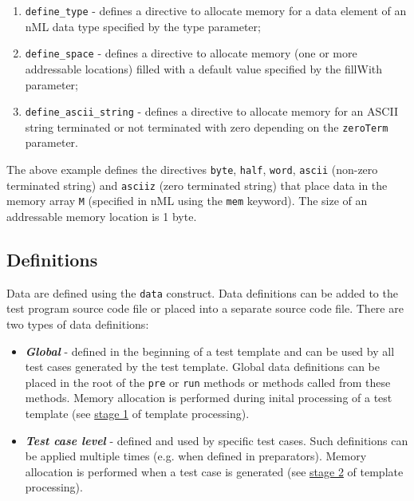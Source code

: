 \documentclass[oneside,final,12pt]{extreport}
\begin{document}
\begin{enumerate}
  \item \texttt{define{\_}type} - defines a directive to allocate memory for a data element
        of an nML data type specified by the type parameter;

  \item \texttt{define{\_}space} - defines a directive to allocate memory (one or more
        addressable locations) filled with a default value specified by the
        fillWith parameter;

  \item \texttt{define{\_}ascii{\_}string} - defines a directive to allocate memory for an
        ASCII string terminated or not terminated with zero depending on the
        \texttt{zeroTerm} parameter.
\end{enumerate}

The above example defines the directives \texttt{byte}, \texttt{half}, \texttt{word},
\texttt{ascii} (non-zero terminated string) and \texttt{asciiz} (zero terminated string)
that place data in the memory array \texttt{M} (specified in nML using the \texttt{mem} keyword).
The size of an addressable memory location is 1 byte.

\subsection{Definitions}

Data are defined using the \texttt{data} construct. Data definitions can be added to the test
program source code file or placed into a separate source code file. There are two types of
data definitions:

\begin{itemize}
\item \textbf{\textit{Global}} - defined in the beginning of a test template and can be used by
      all test cases generated by the test template. Global data definitions can be placed in
      the root of the \texttt{pre} or \texttt{run} methods or methods called from these methods.
      Memory allocation is performed during inital processing of a test template (see
      \hyperref[ttp_stage_1]{stage 1} of template processing).

\item \textbf{\textit{Test case level}} - defined and used by specific test cases. Such definitions
      can be applied multiple times (e.g. when defined in preparators).
      Memory allocation is performed when a test case is generated (see
      \hyperref[ttp_stage_2]{stage 2} of template processing).
\end{itemize}
\end{document}
